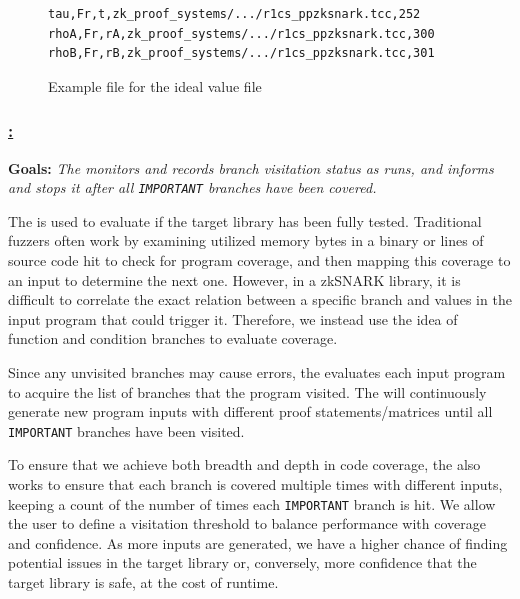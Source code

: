 \begin{figure}[H]
\begin{tcolorbox}
\begin{verbatim}
tau,Fr,t,zk_proof_systems/.../r1cs_ppzksnark.tcc,252
rhoA,Fr,rA,zk_proof_systems/.../r1cs_ppzksnark.tcc,300
rhoB,Fr,rB,zk_proof_systems/.../r1cs_ppzksnark.tcc,301
\end{verbatim}
\end{tcolorbox}
\caption{Example file for the ideal value file}
\label{fig:ideal_value}
\end{figure}





\subsubsection*{\underline{\SnarkFuzzer: \branchmodel}}
\label{subsec:snarkprobe-branch-model}

\textbf{Goals: } \emph{The \branchmodel monitors and records branch visitation status as \SnarkFuzzer runs, and informs and stops it after all \texttt{IMPORTANT} branches have been covered.}

%
The \branchmodel is used to evaluate if the target library has been fully tested. Traditional fuzzers often work by examining utilized memory bytes in a binary or lines of source code hit to check for program coverage, and then mapping this coverage to an input to determine the next one.  However, in a zkSNARK library, it is difficult to correlate the exact relation between a specific branch and values in the input program that could trigger it. Therefore, we instead use the idea of function and condition branches to evaluate coverage.

Since any unvisited branches may cause errors, the \branchmodel evaluates each input program to acquire the list of branches that the program visited. The  will continuously generate new program inputs with different proof statements/matrices until all \texttt{IMPORTANT} branches have been visited.

To ensure that we achieve both breadth and depth in code coverage, the \branchmodel also works to ensure that each branch is covered multiple times with different inputs, keeping a count of the number of times each \texttt{IMPORTANT} branch is hit. We allow the user to define a visitation threshold to balance performance with coverage and confidence.
As more inputs are generated, we have a higher chance of finding potential issues in the target library or, conversely, more confidence that the target library is safe, at the cost of runtime.


